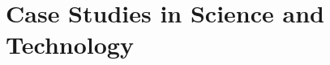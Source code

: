 \renewcommand{\prevpart}{10 }
\renewcommand{\thispart}{11 }
\renewcommand{\nextpart}{12 }

\section{Case Studies in Science and Technology}




